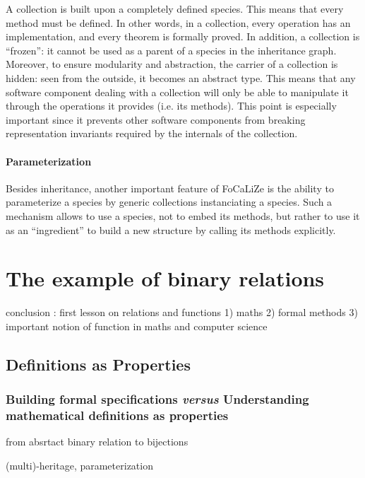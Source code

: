 \documentclass[submission,copyright,creativecommons]{eptcs}
\def\focalize{FoCaLiZe \mbox{}}
\begin{document}
A collection is built upon a completely defined species. This means
that every method must be defined. In other words, in a collection, every 
operation has an implementation, and every theorem is formally proved.
In addition, a collection is ``frozen'': it cannot be used as a parent
of a species in the inheritance graph. Moreover, to ensure modularity
and abstraction, the carrier of a collection is hidden: seen from the
outside, it becomes an abstract type. This means
that any software component dealing with a collection will only be
able to manipulate it through the operations it
provides (i.e. its methods). This point is especially important since
it prevents other
software components from breaking representation invariants required by the
internals of the collection.

\paragraph{Parameterization}

Besides inheritance, another important feature of \focalize is the ability to
parameterize a species by generic collections instanciating a species. Such a
mechanism allows to use a species, not to embed its methods, but rather to
use it as an ``ingredient'' to build a new structure by calling its methods
explicitly.




\section{The example of binary relations}


conclusion : first lesson on relations and functions 1) maths 2)
formal methods 3) important notion of function in maths and computer science


\subsection{Definitions as Properties}

\subsubsection{Building formal specifications {\it versus} Understanding
  mathematical definitions as properties}

from absrtact binary relation to bijections

(multi)-heritage, parameterization
\end{document}
